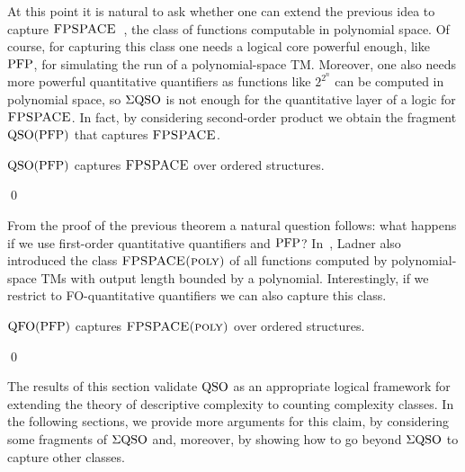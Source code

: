 At this point it is natural to ask whether one can extend the previous idea to capture $\text{\sc FPSPACE}$~\cite{Ladner89}, the class of functions computable in polynomial space. 
Of course, for capturing this class one needs a logical core powerful enough, like ${\rm PFP}$, for simulating the run of a polynomial-space TM.
Moreover, 
one also needs more powerful quantitative quantifiers as functions like $2^{2^n}$ can be computed in polynomial space,
so $\Sigma{\rm QSO}$ is not enough for the quantitative layer of a logic for $\text{\sc FPSPACE}$.
In fact, by considering second-order product we obtain the fragment ${\rm QSO}({\rm PFP})$ that captures $\text{\sc FPSPACE}$. 
\begin{thm} \label{theo:capture-fpspace}
	${\rm QSO}({\rm PFP})$ captures $\text{\sc FPSPACE}$ over ordered structures.
\end{thm}
\proof

\qed

From the proof of the previous theorem a natural question follows: what happens if we use first-order quantitative quantifiers and ${\rm PFP}$?
In~\cite{Ladner89}, Ladner also introduced the class $\text{\sc FPSPACE(poly)}$ of all functions computed by polynomial-space TMs 
with output length bounded by a polynomial.
Interestingly, if we restrict to FO-quantitative quantifiers we can also capture this class.
\begin{cor} \label{cor:capture-fpspace-poly}
	${\rm QFO}({\rm PFP})$ captures $\text{\sc FPSPACE(poly)}$ over ordered structures.
\end{cor}
\proof

\qed

The results of this section validate ${\rm QSO}$ as an appropriate logical framework for extending the theory of descriptive complexity to counting complexity classes. In the following sections, we provide more arguments for this claim, by considering some fragments of $\Sigma{\rm QSO}$ and, moreover, by showing how to go beyond $\Sigma{\rm QSO}$ to capture other classes.
